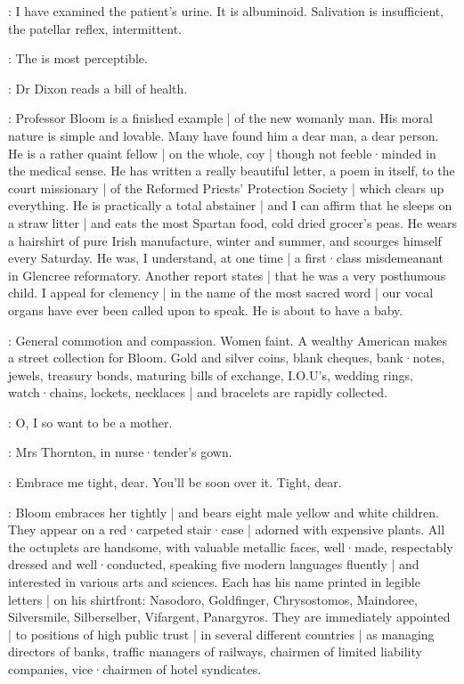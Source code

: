 \DrCrotthers[2]:
I have examined the patient's urine.
It is albuminoid.
Salivation is insufficient,
the patellar reflex,
intermittent.

\DrPunchCostello[2]:
The 
is most perceptible.

:
Dr Dixon reads a bill of health.

\DrDixon:
Professor Bloom is a finished example |
of the new womanly man.
His moral nature is simple and lovable.
Many have found him a dear man,
a dear person.
He is a rather quaint fellow |
on the whole,
coy |
though not feeble·minded in the medical sense.
He has written a really beautiful letter,
a poem in itself,
to the court missionary |
of the Reformed Priests' Protection Society |
which clears up everything.
He is practically a total abstainer |
and I can affirm that he sleeps on a straw litter |
and eats the most Spartan food,
cold dried grocer's peas.
He wears a hairshirt of pure Irish manufacture,
winter and summer,
and scourges himself every Saturday.
He was,
I understand,
at one time |
a first·class misdemeanant in Glencree reformatory.
Another report states |
that he was a very posthumous child.
I appeal for clemency |
in the name of the most sacred word |
our vocal organs have ever been called upon to speak.
He is about to have a baby.

:
General commotion and compassion.
Women faint.
A wealthy American makes a street collection for Bloom.
Gold and silver coins,
blank cheques,
bank·notes,
jewels,
treasury bonds,
maturing bills of exchange,
I.O.U's,
wedding rings,
watch·chains,
lockets,
necklaces |
and bracelets are rapidly collected.

\Bloom:
O,
I so want to be a mother.

:
Mrs Thornton,
in nurse·tender's gown.

\MrsThornton:
Embrace me tight,
dear.
You'll be soon over it.
Tight,
dear.%

:
Bloom embraces her tightly |
and bears eight male yellow and white children.
They appear on a red·carpeted stair·case |
adorned with expensive plants.
All the octuplets are handsome,
with valuable metallic faces,
well·made,
respectably dressed and well·conducted,
speaking five modern languages fluently |
and interested in various arts and sciences.
Each has his name printed in legible letters |
on his shirtfront:
Nasodoro,
Goldfinger,
Chrysostomos,
Maindoree,
Silversmile,
Silberselber,
Vifargent,
Panargyros.
They are immediately appointed |
to positions of high public trust |
in several different countries |
as managing directors of banks,
traffic managers of railways,
chairmen of limited liability companies,
vice·chairmen of hotel syndicates.

